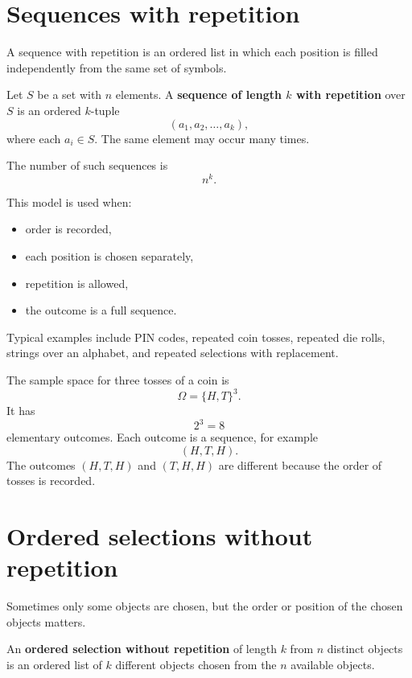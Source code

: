 \section{Sequences with repetition}

A sequence with repetition is an ordered list in which each position is filled independently from the same set of symbols.

\begin{definitionbox}
Let \(S\) be a set with \(n\) elements. A \textbf{sequence of length \(k\) with repetition} over \(S\) is an ordered \(k\)-tuple
\[
(a_1,a_2,\ldots,a_k),
\]
where each \(a_i\in S\). The same element may occur many times.
\end{definitionbox}

The number of such sequences is
\[
n^k.
\]

This model is used when:
\begin{itemize}
    \item order is recorded,
    \item each position is chosen separately,
    \item repetition is allowed,
    \item the outcome is a full sequence.
\end{itemize}

Typical examples include PIN codes, repeated coin tosses, repeated die rolls, strings over an alphabet, and repeated selections with replacement.

\begin{examplebox}
The sample space for three tosses of a coin is
\[
\Omega=\{H,T\}^3.
\]
It has
\[
2^3=8
\]
elementary outcomes. Each outcome is a sequence, for example
\[
(H,T,H).
\]
The outcomes \((H,T,H)\) and \((T,H,H)\) are different because the order of tosses is recorded.
\end{examplebox}

\section{Ordered selections without repetition}

Sometimes only some objects are chosen, but the order or position of the chosen objects matters.

\begin{definitionbox}
An \textbf{ordered selection without repetition} of length \(k\) from \(n\) distinct objects is an ordered list of \(k\) different objects chosen from the \(n\) available objects.
\end{definitionbox}

